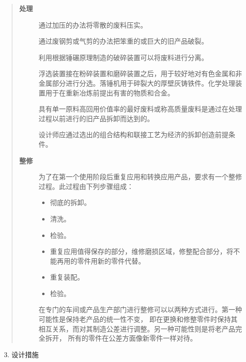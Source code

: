 \documentclass[letterpaper,10pt,english]{sphinxmanual}
\begin{document}
\begin{quote}
\begin{description}
\item[{\textbf{处理}}] \leavevmode
通过加压的办法将零散的废料压实。

通过废钢剪或气剪的办法把笨重的或巨大的旧产品破裂。

利用根据锤碾原理制造的破碎装置可以将废料进行分离。

浮选装置接在粉碎装置和磨碎装置之后，用于较好地对有色金属和非金属部分进行分选。落锤机用于碎裂大的厚壁灰铸铁件。化学处理装置用于在重新冶炼前提出有害的物质和合金。

具有单一原料高回用价值率的最好废料或称高质量废料是通过在处理过程以前进行的旧产品拆卸而达到的。

设计师应通过选出的组合结构和联接工艺为经济的拆卸创造前提条件。

\item[{\textbf{整修}}] \leavevmode
为了在第一个使用阶段后重复应用和转换应用产品，要求有一个整修过程。此过程由下列步骤组成：
\begin{itemize}
\item {} 
彻底的拆卸。

\item {} 
清洗。

\item {} 
检验。

\item {} 
重复应用值得保存的部分，维修磨损区域，修整配合部分，将不能再用的零件用新的零件代替。

\item {} 
重复装配。

\item {} 
检验。

\end{itemize}

在专门的车间或产品生产部门进行整修可以以两种方式进行。第一种可能性是保持老产品的统一性不变，
即在更换和修整零件时保持其相互关系，而对其制造公差进行调整。另一种可能性则是将老产品完全拆开，
所有的零件在公差方面像新零件一样对待。

\end{description}
\end{quote}
\begin{enumerate}
\setcounter{enumi}{2}
\item {} 
设计措施

\end{enumerate}
\end{document}
